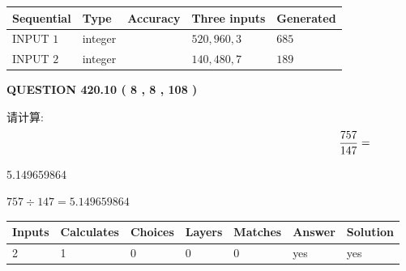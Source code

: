 \documentclass{ctexart}
\begin{document}
   
  
  
\noindent\begin{tabular}{|l|l|l|l|l|}
\hline
 Sequential & Type & Accuracy & Three inputs & Generated \\ 
\hline
 
 
  INPUT $  1 $ & integer &  & $
 520
 , 
 960
 , 
 3
 $ & $ 685 $ 
 \\  \hline  
 
 
  INPUT $  2 $ & integer &  & $
 140
 , 
 480
 , 
 7
 $ & $ 189 $ 
 \\  \hline  
 \end{tabular}
   
   
  
\vspace{0.2in}
  
{\textbf{\Large{QUESTION
420.10 
 ( 8 , 8 , 108 )
}}}
  
  
 
请计算:
\begin{equation}
\frac { %
757 }  {  %
147} = \nonumber
\end{equation}
 
 
 
\noindent{}
 
 

5.149659864
 
 
\noindent{}
 
 

 
 
 
\noindent{}
 
 

$ %
757 \div  %
147=   %
5.149659864$
 
 
\noindent{}
 
 

 
   
   
   
   
\noindent\begin{tabular}{|l|l|l|l|l|l|l|}
 \hline
Inputs & Calculates & Choices & Layers & Matches & Answer & Solution \\ \hline
 2  & 
 1  & 
 0
  & 
 0  & 
 0  & 
  yes & 
  yes 
  \\ \hline
 \end{tabular}
   
\end{document}
